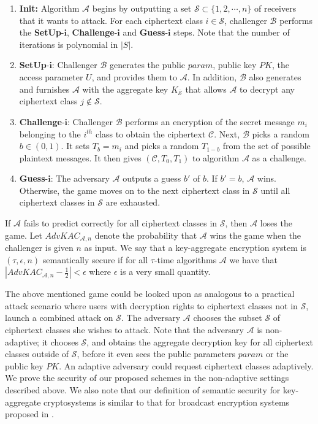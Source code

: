 \begin{enumerate}
 \item \textbf{Init:} Algorithm $\mathcal{A}$ begins by outputting a set $\mathcal{S} \subset \{1,2,\cdots,n\}$ of receivers that it wants to
attack.  For each ciphertext class $i\in\mathcal{S}$, challenger $\mathcal{B}$ performs the \textbf{SetUp}-$\mathbf{i}$, \textbf{Challenge}-$\mathbf{i}$ and \textbf{Guess}-$\mathbf{i}$ steps. Note that the number of iterations is polynomial in $|S|$.

 \item \textbf{SetUp}-$\mathbf{i}$: Challenger $\mathcal{B}$ generates the public $param$, public key $PK$, the access parameter $U$, and provides them to $\mathcal{A}$. In addition, $\mathcal{B}$ also generates and furnishes $\mathcal{A}$ with the aggregate key $K_{\overline{\mathcal{S}}}$ that allows $\mathcal{A}$ to decrypt any ciphertext class $j\notin\mathcal{S}$. 
 \item \textbf{Challenge}-$\mathbf{i}$: Challenger $\mathcal{B}$ performs an encryption of the secret message $m_i$ belonging to the $i^{th}$ class to obtain the ciphertext $\mathcal{C}$. Next, $\mathcal{B}$ picks a random $b\in{(0,1)}$. It sets $T_b = m_i$ and picks a random $T_{1- b}$ from the set of possible plaintext messages. It then gives $(\mathcal{C}, T_0, T_1)$ to algorithm $\mathcal{A}$ as a challenge.

 
 \item\textbf{Guess}-$\mathbf{i}$: The adversary $\mathcal{A}$ outputs a guess $b'$ of $b$. If $b' = b$, $\mathcal{A}$ wins. Otherwise, the game moves on to the next ciphertext class in $\mathcal{S}$ until all ciphertext classes in $\mathcal{S}$ are exhausted.
\end{enumerate}
If $\mathcal{A}$ fails to predict correctly for all ciphertext classes in $\mathcal{S}$, then $\mathcal{A}$ loses the game. Let $AdvKAC_{\mathcal{A},n}$ denote the probability that $\mathcal{A}$ wins the game when the challenger is given $n$ as input. We say that a key-aggregate encryption system is $(\tau,\epsilon,n)$ semantically secure if for all $\tau$-time algorithms $\mathcal{A}$ we have that $|AdvKAC_{\mathcal{A},n}-\frac{1}{2}| < \epsilon$ where $\epsilon$ is a very small quantity. 

The above mentioned game could be looked upon as analogous to a practical attack scenario where users with decryption rights to ciphertext classes not in $\mathcal{S}$, launch a combined attack on $\mathcal{S}$. The adversary $\mathcal{A}$ chooses the subset $\mathcal{S}$ of ciphertext classes she wishes to attack. Note that the adversary $\mathcal{A}$ is non-adaptive; it chooses $\mathcal{S}$, and obtains the aggregate decryption key for all ciphertext classes outside of $\mathcal{S}$, before it even sees the public parameters $param$ or the public key $PK$. An adaptive adversary could request ciphertext classes adaptively. We prove the security of our proposed schemes in the non-adaptive settings described above. We also note that our definition of semantic security for key-aggregate cryptosystems is similar to that for broadcast encryption systems proposed in \cite{boneh2005collusion}.


